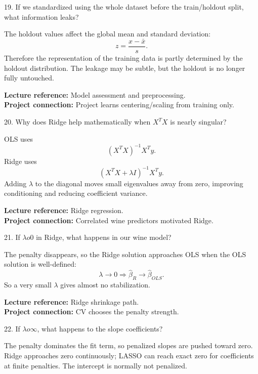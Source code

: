 \documentclass[10.5pt,a4paper]{article}
\newcommand{\chapref}[1]{\textbf{Lecture reference:} #1}
\newcommand{\projectref}[1]{\textbf{Project connection:} #1}
\begin{document}
\begin{qbox}{19. If we standardized using the whole dataset before the train/holdout split, what information leaks?}
\end{qbox}
\begin{answerbox}The holdout values affect the global mean and standard deviation:
\[
z=\frac{x-\bar x}{s}.
\]
Therefore the representation of the training data is partly determined by the holdout distribution. The leakage may be subtle, but the holdout is no longer fully untouched.\end{answerbox}
\begin{refbox}\chapref{Model assessment and preprocessing.}\\\projectref{Project learns centering/scaling from training only.}\end{refbox}
\begin{qbox}{20. Why does Ridge help mathematically when $X^TX$ is nearly singular?}
\end{qbox}
\begin{answerbox}OLS uses
\[
(X^TX)^{-1}X^Ty.
\]
Ridge uses
\[
(X^TX+\lambda I)^{-1}X^Ty.
\]
Adding \(\lambda\) to the diagonal moves small eigenvalues away from zero, improving conditioning and reducing coefficient variance.\end{answerbox}
\begin{refbox}\chapref{Ridge regression.}\\\projectref{Correlated wine predictors motivated Ridge.}\end{refbox}
\begin{qbox}{21. If $\lambda	o0$ in Ridge, what happens in our wine model?}
\end{qbox}
\begin{answerbox}The penalty disappears, so the Ridge solution approaches OLS when the OLS solution is well-defined:
\[
\lambda\to0\Rightarrow \hat\beta_R\to\hat\beta_{OLS}.
\]
So a very small \(\lambda\) gives almost no stabilization.\end{answerbox}
\begin{refbox}\chapref{Ridge shrinkage path.}\\\projectref{CV chooses the penalty strength.}\end{refbox}
\begin{qbox}{22. If $\lambda	o\infty$, what happens to the slope coefficients?}
\end{qbox}
\begin{answerbox}The penalty dominates the fit term, so penalized slopes are pushed toward zero. Ridge approaches zero continuously; LASSO can reach exact zero for coefficients at finite penalties. The intercept is normally not penalized.\end{answerbox}
\end{document}
